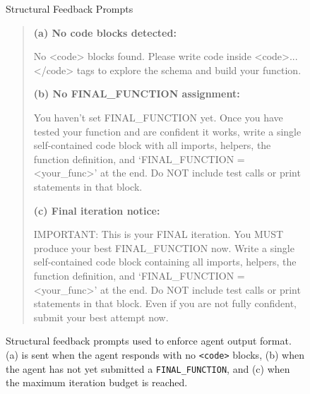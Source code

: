 \begin{figure}[h]
    \begin{AIbox}{Structural Feedback Prompts}

\begin{quote}
\ttfamily
\tiny
\vspace{2mm}

\textbf{(a) No code blocks detected:}

No <code> blocks found. Please write code inside <code>...</code> tags to explore the schema and build your function.

\vspace{3mm}

\textbf{(b) No FINAL\_FUNCTION assignment:}

You haven't set FINAL\_FUNCTION yet.
Once you have tested your function and are confident it works, write a
single self-contained code block with all imports, helpers, the function
definition, and `FINAL\_FUNCTION = <your\_func>' at the end.
Do NOT include test calls or print statements in that block.

\vspace{3mm}

\textbf{(c) Final iteration notice:}

IMPORTANT: This is your FINAL iteration. You MUST produce your best
FINAL\_FUNCTION now. Write a single self-contained code block containing
all imports, helpers, the function definition, and
`FINAL\_FUNCTION = <your\_func>' at the end.
Do NOT include test calls or print statements in that block.
Even if you are not fully confident, submit your best attempt now.

\end{quote}

\end{AIbox}
    \caption{Structural feedback prompts used to enforce agent output format. (a) is sent when the agent responds with no \texttt{<code>} blocks, (b) when the agent has not yet submitted a \texttt{FINAL\_FUNCTION}, and (c) when the maximum iteration budget is reached.}
    \label{prompts:structural_feedback}

\end{figure}
